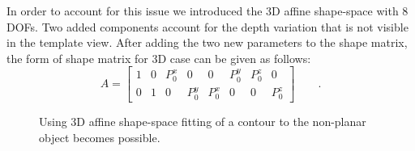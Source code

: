 In order to account for this issue we introduced the 3D affine
shape-space with 8 DOFs.
Two added components
account for the depth variation that is not visible in the template
view. After adding the two new parameters to the shape matrix, the form
of shape matrix for 3D case can be given as follows:
\begin{equation}
  \label{eq:4.18}
  A =
  \begin{bmatrix}
    1 & 0 & P_0^x & 0 & 0 & P_0^y & P_0^z & 0\\
    0 & 1 & 0 & P_0^y & P_0^x & 0 & 0  & P_0^z
  \end{bmatrix}\qquad.
\end{equation}

\begin{figure}[htbp]
  \begin{minipage}[t]{0.5\linewidth} 
    \centering 
  \end{minipage}%
  \begin{minipage}[t]{0.5\linewidth} 
    \centering 
  \end{minipage} 
  \caption[Fitting the contour of non-planar object]{Using 3D
    affine shape-space fitting of a contour to the non-planar object
    becomes possible.}
\label{fig:box_match}
\end{figure}


